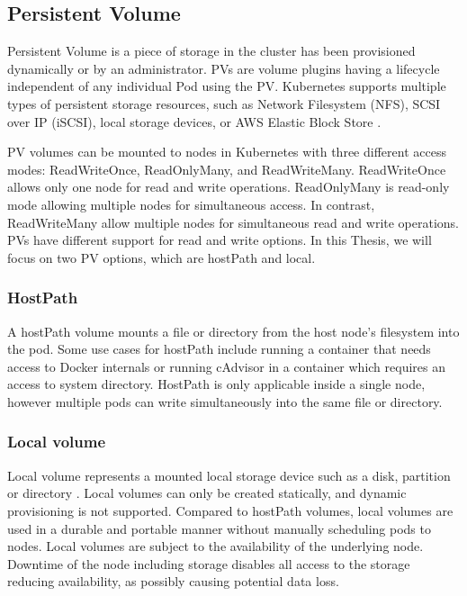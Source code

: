 \subsection{Persistent Volume}

Persistent Volume is a piece of storage in the cluster has been provisioned dynamically or by an administrator. PVs are volume plugins having a lifecycle independent of any individual Pod using the PV. Kubernetes supports multiple types of persistent storage resources, such as Network Filesystem (NFS), SCSI over IP (iSCSI), local storage devices, or AWS Elastic Block Store \cite{AmazonEBS}. \cite{PV}

PV volumes can be mounted to nodes in Kubernetes with three different access modes: ReadWriteOnce, ReadOnlyMany, and ReadWriteMany. ReadWriteOnce allows only one node for read and write operations. ReadOnlyMany is read-only mode allowing multiple nodes for simultaneous access. In contrast, ReadWriteMany allow multiple nodes for simultaneous read and write operations. PVs have different support for read and write options. In this Thesis, we will focus on two PV options, which are hostPath and local. \cite{PV} 

\subsubsection{HostPath}

A hostPath volume mounts a file or directory from the host node's filesystem into the pod. Some use cases for hostPath include running a container that needs access to Docker internals or running cAdvisor in a container which requires an access to system directory. HostPath is only applicable inside a single node, however multiple pods can write simultaneously into the same file or directory.

\subsubsection{Local volume}

Local volume represents a mounted local storage device such as a disk, partition or directory \cite{VolumesKubernetes}. Local volumes can only be created statically, and dynamic provisioning is not supported. Compared to hostPath volumes, local volumes are used in a durable and portable manner without manually scheduling pods to nodes. Local volumes are subject to the availability of the underlying node. Downtime of the node including storage disables all access to the storage reducing availability, as possibly causing potential data loss.

